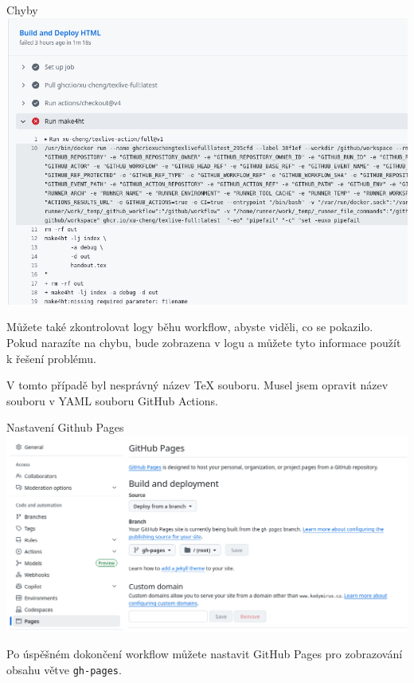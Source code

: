 \begin{frame}[fragile]{Chyby}
\includegraphics[width=\textwidth]{img/github-error.png}
\end{frame}

Můžete také zkontrolovat logy běhu workflow, abyste viděli, co se pokazilo.
Pokud narazíte na chybu, bude zobrazena v logu a můžete tyto informace
použít k řešení problému.

V tomto případě byl nesprávný název TeX souboru. Musel jsem opravit název
souboru v YAML souboru GitHub Actions.


\begin{frame}[fragile]{Nastavení Github Pages}
\includegraphics[width=\textwidth]{img/github-pages.png}
\end{frame}

Po úspěšném dokončení workflow můžete nastavit GitHub Pages pro zobrazování obsahu větve \texttt{gh-pages}.


